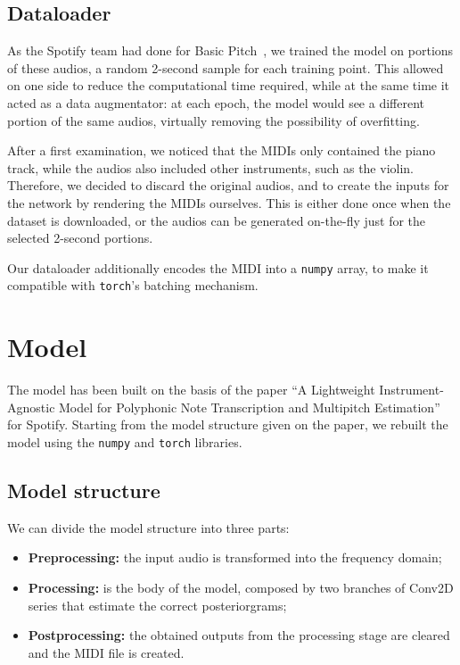 \documentclass[10pt,twocolumn,letterpaper]{article}
\begin{document}
\subsection{Dataloader}

As the Spotify team had done for Basic Pitch~\cite{spoty-audio}, we trained the model on portions of these audios, a random \num{2}-second sample for each training point.
This allowed on one side to reduce the computational time required, while at the same time it acted as a data augmentator: at each epoch, the model would see a different portion of the same audios, virtually removing the possibility of overfitting.

After a first examination, we noticed that the MIDIs only contained the piano track, while the audios also included other instruments, such as the violin.
Therefore, we decided to discard the original audios, and to create the inputs for the network by rendering the MIDIs ourselves.
This is either done once when the dataset is downloaded, or the audios can be generated on-the-fly just for the selected \num{2}-second portions.

Our dataloader additionally encodes the MIDI into a \texttt{numpy} array, to make it compatible with \texttt{torch}'s batching mechanism.

\section{Model}\label{sec:model}

The model has been built on the basis of the paper ``A Lightweight Instrument-Agnostic Model for Polyphonic Note Transcription and Multipitch Estimation''\cite{spoty-audio} for Spotify. Starting from the model structure given on the paper, we rebuilt the model using the \texttt{numpy} and \texttt{torch} libraries.

\subsection{Model structure}

We can divide the model structure into three parts:
\begin{itemize}
    \item \textbf{Preprocessing:} the input audio is transformed into the frequency domain;
    \item \textbf{Processing:} is the body of the model, composed by two branches of Conv2D series that estimate the correct posteriorgrams;
    \item \textbf{Postprocessing:} the obtained outputs from the processing stage are cleared and the MIDI file is created.  
\end{itemize}
\end{document}
